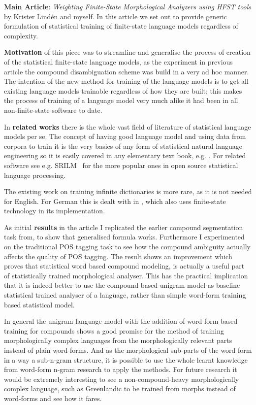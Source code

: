 \documentclass[officiallayout,draft]{unihelcompling}
\begin{document}
\textbf{Main Article}: \emph{Weighting Finite-State Morphological Analyzers
using HFST tools} by Krister Lindén and myself. In this article we set out
to provide generic formulation of statistical training of finite-state
language models regardless of complexity.

\textbf{Motivation} of this piece was to streamline and generalise the process
of creation of the statistical finite-state language models, as the experiment
in previous article  the compound
disambiguation scheme was build in a very ad hoc manner. The intention of the
new method for training of the language models is to get all existing language
models trainable regardless of how they are built; this makes the process of
training of a language model very much alike it had been in all
non-finite-state software to date.

In \textbf{related works} there is the whole vast field of literature of
statistical language models per se. The concept of having good language model
and using data from corpora to train it is the very basics of any form of
statistical natural language engineering so it is easily covered in any
elementary text book, e.g. \citet{manning1999foundations}. For related software
see e.g.  SRILM~\citep{stolcke2002srilm} for the more popular ones in open
source statistical language processing.

The existing work on training infinite dictionaries is more rare, as it is not
needed for English. For German this is dealt with in
\citep{schiller2006german}, which also uses finite-state technology in its
implementation.

As initial \textbf{results} in the article I replicated the earlier compound
segmentation task from, to show that generalised formula works.
Furthermore I experimented on the traditional POS tagging task to see how the
compound ambiguity actually affects the quality of POS tagging. The result
shows an improvement which proves that statistical word based compound
modeling, is actually a useful part of statistically trained morphological
analyser. This has the practical implication that it is indeed better to
use the compound-based unigram model as baseline statistical trained analyser
of a language, rather than simple word-form training based statistical model.

In general the unigram language model with the addition of word-form based
training for compounds shows a good promise for the method of training
morphologically complex languages from the morphologically relevant parts
instead of plain word-forms. And as the morphological sub-parts of the word
form in a way a sub-n-gram structure, it is possible to use the whole learnt
knowledge from word-form n-gram research to apply the methods. For future
research it would be extremely interesting to see a non-compound-heavy
morphologically complex language, such as Greenlandic to be trained from morphs
instead of word-forms and see how it fares.
\end{document}
